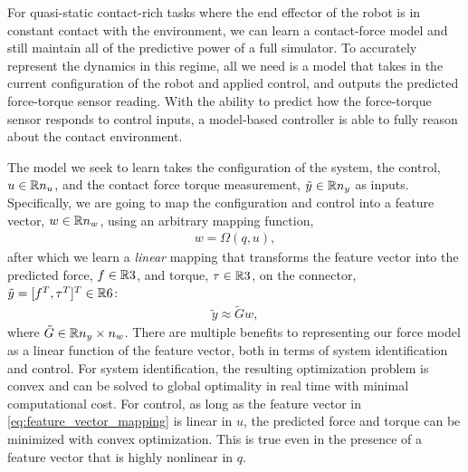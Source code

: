 For quasi-static contact-rich tasks where the end effector of the robot is in constant contact with the environment, we can learn a contact-force model and still maintain all of the predictive power of a full simulator. To accurately represent the dynamics in this regime, all we need is a model that takes in the current configuration of the robot and applied control, and outputs the predicted force-torque sensor reading.  With the ability to predict how the force-torque sensor responds to control inputs, a model-based controller is able to fully reason about the contact environment. 

The model we seek to learn takes the configuration of the system, the control, $u \in \mathbb{R}{n_u}$, and the contact force torque measurement, $\tilde{y} \in \mathbb{R}{n_y}$ as inputs. Specifically, we are going to map the configuration and control into a feature vector, $w \in \mathbb{R}{n_w}$, using an arbitrary mapping function,
%
\begin{align}
    w = \Omega(q, u), \label{eq:feature_vector_mapping}
\end{align}
%
after which we learn a \textit{linear} mapping that transforms the feature vector into the predicted force, $f \in \mathbb{R}{3}$, and torque, $\tau \in \mathbb{R}{3}$, on the connector, $\tilde{y} = [f^T, \tau^T]^T \in \mathbb{R}{6}$:
%
\begin{align}
    \tilde{y} \approx \tilde{G}w \label{eq:linmod},
\end{align}
%
where $\tilde{G} \in \mathbb{R}{n_y \times n_w}$. There are multiple benefits to representing our force model as a linear function of the feature vector, both in terms of system identification and control. For system identification, the resulting optimization problem is convex and can be solved to global optimality in real time with minimal computational cost. For control, as long as the feature vector in \eqref{eq:feature_vector_mapping} is linear in $u$, the predicted force and torque can be minimized with convex optimization. This is true even in the presence of a feature vector that is highly nonlinear in $q$.
%
